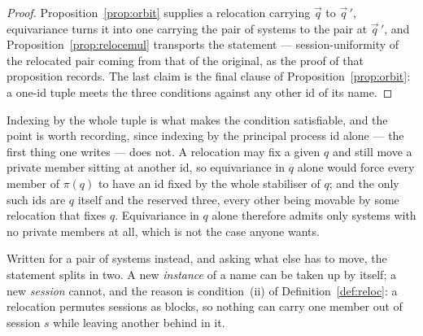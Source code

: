 \documentclass[11pt,a4paper]{article}
\theoremstyle{accentdef}
\theoremstyle{accentplain}
\begin{document}
\begin{proof}
Proposition~\ref{prop:orbit} supplies a relocation carrying $\vec q$ to $\vec q\,'$, equivariance
turns it into one carrying the pair of systems to the pair at $\vec q\,'$, and
Proposition~\ref{prop:relocemul} transports the statement --- session-uniformity of the relocated
pair coming from that of the original, as the proof of that proposition records. The last claim is the
final clause of Proposition~\ref{prop:orbit}: a one-id tuple meets the three conditions against any
other id of its name.
\end{proof}

Indexing by the whole tuple is what makes the condition satisfiable, and the point is worth
recording, since indexing by the principal process id alone --- the first thing one writes --- does
not. A relocation may fix a given $q$ and still move a private member sitting at another id, so
equivariance in $q$ alone would force every member of $\pi(q)$ to have an id fixed by the whole
stabiliser of $q$; and the only such ids are $q$ itself and the reserved three, every other being
movable by some relocation that fixes $q$. Equivariance in $q$ alone therefore admits only systems
with no private members at all, which is not the case anyone wants.

Written for a pair of systems instead, and asking what else has to move, the statement splits in
two. A new \emph{instance} of a name can be taken up by itself; a new \emph{session} cannot, and
the reason is condition~(ii) of Definition~\ref{def:reloc}: a relocation permutes sessions as
blocks, so nothing can carry one member out of session $s$ while leaving another behind in it.
\end{document}
